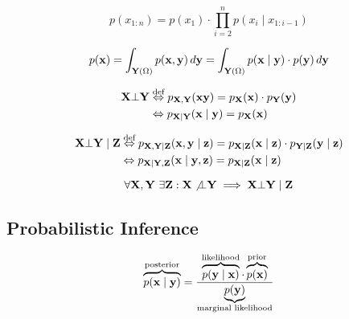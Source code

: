 \begin{definition*}
  \[p(x_{1:n}) = p(x_1)\cdot \prod_{i=2}^n p(x_i \mid x_{1:i-1})\]
\end{definition*}

\begin{theorem*}
  \[p(\vb{x}) = \int_{\vb{Y}(\Omega)} p(\vb{x}, \vb{y}) \, d\vb{y} = \int_{\vb{Y}(\Omega)} p(\vb{x} \mid \vb{y}) \cdot p(\vb{y}) \, d\vb{y}\]
\end{theorem*}

\begin{definition*}[Independence]
  \begin{align*}
    \vb{X} \bot \vb{Y} &\overset{\text{def}}{\Leftrightarrow} p_{\vb{X}, \vb{Y}}(\vb{x} \vb{y}) = p_{\vb{X}}(\vb{x}) \cdot p_{\vb{Y}}(\vb{y}) \\
    &\Leftrightarrow p_{\vb{X} \mid \vb{Y}}(\vb{x} \mid \vb{y}) = p_{\vb{X}}(\vb{x})
  \end{align*}
\end{definition*}

\begin{definition*}
  \begin{align*}
    \vb{X} \bot \vb{Y} \mid \vb{Z} &\overset{\text{def}}{\Leftrightarrow} p_{\vb{X}, \vb{Y} \mid \vb{Z}}(\vb{x}, \vb{y} \mid \vb{z}) = p_{\vb{X} \mid \vb{Z}}(\vb{x} \mid \vb{z}) \cdot p_{\vb{Y} \mid \vb{Z}}(\vb{y} \mid \vb{z}) \\
    &\Leftrightarrow p_{\vb{X} \mid \vb{Y}, \vb{Z}}(\vb{x} \mid \vb{y}, \vb{z}) = p_{\vb{X} \mid \vb{Z}}(\vb{x} \mid \vb{z})
  \end{align*}
\end{definition*}

\begin{theorem*}
  \[\forall \vb{X}, \vb{Y} \ \exists \vb{Z}: \vb{X} \not\bot \vb{Y} \implies \vb{X} \bot \vb{Y} \mid \vb{Z}\]
\end{theorem*}

\subsection{Probabilistic Inference}
\[\overbrace{p(\vb{x} \mid \vb{y})}^{\text{posterior}} = \frac{\overbrace{p(\vb{y} \mid \vb{x})}^{\text{likelihood}} \cdot \overbrace{p(\vb{x})}^{\text{prior}}}{\underbrace{p(\vb{y})}_{\text{marginal likelihood}}}\]

